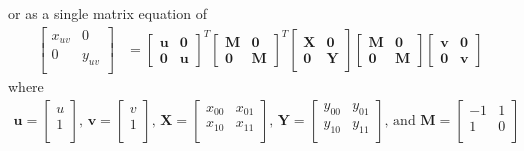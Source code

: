 \documentclass{report}
\begin{document}
or as a single matrix equation of 
\begin{equation*}
\begin{split}
\begin{bmatrix}x_{uv} & 0 \\ 0 & y_{uv}\\\end{bmatrix}
&=
\begin{bmatrix}\mathbf{u} & \mathbf{0} \\ \mathbf{0} & \mathbf{u} \end{bmatrix}^{T}
\begin{bmatrix}\mathbf{M} & \mathbf{0} \\ \mathbf{0} & \mathbf{M} \end{bmatrix}^{T}
\begin{bmatrix}\mathbf{X} & \mathbf{0} \\ \mathbf{0} & \mathbf{Y} \end{bmatrix}
\begin{bmatrix}\mathbf{M} & \mathbf{0} \\ \mathbf{0} & \mathbf{M} \end{bmatrix}
\begin{bmatrix}\mathbf{v} & \mathbf{0} \\ \mathbf{0} & \mathbf{v} \end{bmatrix}
\end{split}
\end{equation*}
where
\begin{equation*}
\begin{split}
%
\mathbf{u} =\begin{bmatrix}u \\ 1\\\end{bmatrix}
\text{, }
%
\mathbf{v} =\begin{bmatrix}v \\ 1\\\end{bmatrix}
\text{, }
%
\mathbf{X} =\begin{bmatrix}x_{00} & x_{01} \\ x_{10} & x_{11}\\\end{bmatrix}
\text{, }
%
\mathbf{Y} =\begin{bmatrix}y_{00} & y_{01} \\ y_{10} & y_{11}\\\end{bmatrix}
\text{, and }
%
\mathbf{M} =\begin{bmatrix}-1 & 1 \\ 1 & 0\\\end{bmatrix}
\end{split}
\end{equation*}
\end{document}
